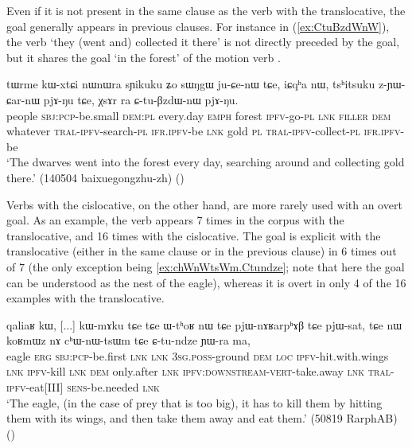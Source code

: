Even if it is not present in the same clause as the verb with the translocative, the goal generally appears in previous clauses. For instance in (\ref{ex:CtuBzdWnW}), the verb  `they (went and) collected it there' is not directly preceded by the goal, but it shares the goal  `in the forest' of the motion verb .

\begin{exe}
\ex \label{ex:CtuBzdWnW} 
\gll tɯrme kɯ-xtɕi nɯnɯra sɲikuku ʑo sɯŋgɯ ju-ɕe-nɯ tɕe, iɕqʰa nɯ, tsʰitsuku z-ɲɯ-ɕar-nɯ pjɤ-ŋu tɕe, χsɤr ra ɕ-tu-βzdɯ-nɯ pjɤ-ŋu. \\
people \textsc{sbj}:\textsc{pcp}-be.small \textsc{dem}:\textsc{pl} every.day \textsc{emph} forest \textsc{ipfv}-go-\textsc{pl} \textsc{lnk} \textsc{filler} \textsc{dem} whatever \textsc{tral}-\textsc{ipfv}-search-\textsc{pl} \textsc{ifr}.\textsc{ipfv}-be \textsc{lnk} gold \textsc{pl} \textsc{tral}-\textsc{ipfv}-collect-\textsc{pl} \textsc{ifr}.\textsc{ipfv}-be \\
\glt `The dwarves went into the forest every day, searching around and collecting gold there.' (140504 baixuegongzhu-zh)
()
\end{exe} 

Verbs with the cislocative, on the other hand, are more rarely used with an overt goal. As an example, the verb  appears 7 times in the corpus with the translocative, and 16 times with the cislocative. The goal is explicit with the translocative (either in the same clause or in the previous clause) in 6 times out of 7 (the only exception being \ref{ex:chWnWtsWm.Ctundze}; note that here the goal can be understood as the nest of the eagle), whereas it is overt in only 4 of the 16 examples with the translocative.

\begin{exe}
\ex \label{ex:chWnWtsWm.Ctundze}
\gll qaliaʁ kɯ, [...] kɯ-mɤku tɕe tɕe ɯ-tʰoʁ nɯ tɕe pjɯ-nɤʁarpʰɤβ tɕe pjɯ-sat,  tɕe nɯ koʁmɯz nɤ cʰɯ-nɯ-tsɯm tɕe ɕ-tu-ndze ɲɯ-ra ma, \\
eagle \textsc{erg} { } \textsc{sbj}:\textsc{pcp}-be.first \textsc{lnk} \textsc{lnk} \textsc{3sg}.\textsc{poss}-ground \textsc{dem} \textsc{loc} \textsc{ipfv}-hit.with.wings \textsc{lnk} \textsc{ipfv}-kill \textsc{lnk} \textsc{dem}  only.after \textsc{lnk} \textsc{ipfv}:\textsc{downstream}-\textsc{vert}-take.away \textsc{lnk} \textsc{tral}-\textsc{ipfv}-eat[III] \textsc{sens}-be.needed \textsc{lnk} \\
\glt `The eagle, (in the case of prey that is too big), it has to kill them by hitting them with its wings, and then take them away and  eat them.' (50819 RarphAB)
()
\end{exe}

